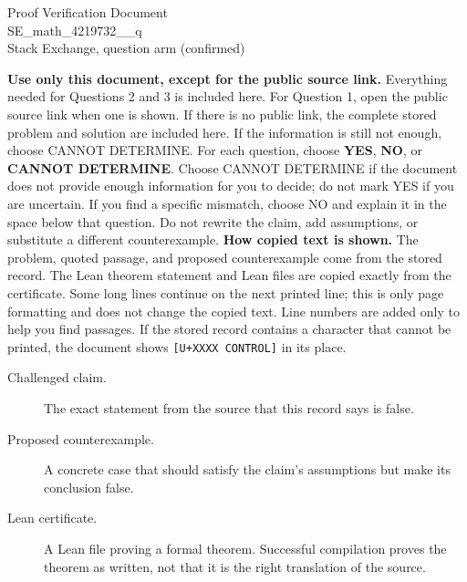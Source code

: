 \documentclass[11pt]{article}
\begin{document}
\begin{center}{\LARGE Proof Verification Document}\\[2pt]{\large SE\_math\_4219732\_\_q}\\[2pt]{\small Stack Exchange, question arm (confirmed)}\end{center}
\begin{center}\end{center}
\textbf{Use only this document, except for the public source link.} Everything needed for Questions 2 and 3 is included here. For Question 1, open the public source link when one is shown. If there is no public link, the complete stored problem and solution are included here. If the information is still not enough, choose CANNOT DETERMINE.
For each question, choose \textbf{YES}, \textbf{NO}, or \textbf{CANNOT DETERMINE}. Choose CANNOT DETERMINE if the document does not provide enough information for you to decide; do not mark YES if you are uncertain. If you find a specific mismatch, choose NO and explain it in the space below that question. Do not rewrite the claim, add assumptions, or substitute a different counterexample.
\textbf{How copied text is shown.} The problem, quoted passage, and proposed counterexample come from the stored record. The Lean theorem statement and Lean files are copied exactly from the certificate. Some long lines continue on the next printed line; this is only page formatting and does not change the copied text. Line numbers are added only to help you find passages. If the stored record contains a character that cannot be printed, the document shows \texttt{[U+XXXX CONTROL]} in its place.
\begin{description}
\item[Challenged claim.] The exact statement from the source that this record says is false.
\item[Proposed counterexample.] A concrete case that should satisfy the claim's assumptions but make its conclusion false.
\item[Lean certificate.] A Lean file proving a formal theorem. Successful compilation proves the theorem as written, not that it is the right translation of the source.
\end{description}
\end{document}
